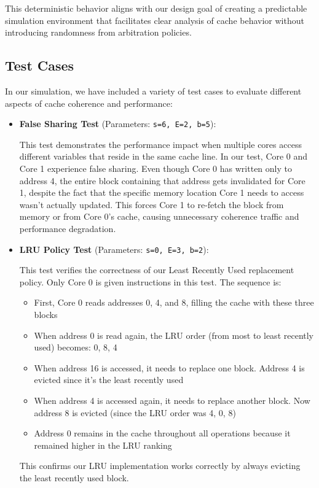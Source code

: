 \documentclass[11pt,a4paper]{article}
\begin{document}
    This deterministic behavior aligns with our design goal of creating a predictable simulation environment that facilitates clear analysis of cache behavior without introducing randomness from arbitration policies.

    \subsection{Test Cases}

    In our simulation, we have included a variety of test cases to evaluate different aspects of cache coherence and performance:

    \begin{itemize}[leftmargin=*]
        \item \textbf{False Sharing Test} (Parameters: \texttt{s=6, E=2, b=5}): 
        
        This test demonstrates the performance impact when multiple cores access different variables that reside in the same cache line. In our test, Core 0 and Core 1 experience false sharing. Even though Core 0 has written only to address 4, the entire block containing that address gets invalidated for Core 1, despite the fact that the specific memory location Core 1 needs to access wasn't actually updated. This forces Core 1 to re-fetch the block from memory or from Core 0's cache, causing unnecessary coherence traffic and performance degradation.
        
        \item \textbf{LRU Policy Test} (Parameters: \texttt{s=0, E=3, b=2}): 
        
        This test verifies the correctness of our Least Recently Used replacement policy. Only Core 0 is given instructions in this test. The sequence is:
        \begin{itemize}
            \item First, Core 0 reads addresses 0, 4, and 8, filling the cache with these three blocks
            \item When address 0 is read again, the LRU order (from most to least recently used) becomes: 0, 8, 4
            \item When address 16 is accessed, it needs to replace one block. Address 4 is evicted since it's the least recently used
            \item When address 4 is accessed again, it needs to replace another block. Now address 8 is evicted (since the LRU order was 4, 0, 8)
            \item Address 0 remains in the cache throughout all operations because it remained higher in the LRU ranking
        \end{itemize}
        This confirms our LRU implementation works correctly by always evicting the least recently used block.
        

\end{itemize}
\end{document}
